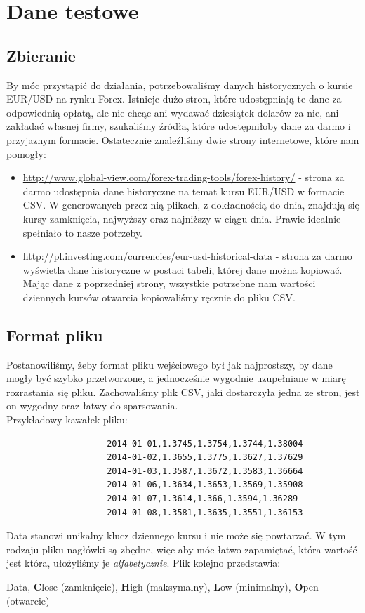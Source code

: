 \documentclass[a4paper]{article}
\begin{document}
		\section{Dane testowe}
			\subsection{Zbieranie}
				By móc przystąpić do działania, potrzebowaliśmy danych historycznych o kursie EUR/USD na rynku Forex. Istnieje dużo stron, które udostępniają te dane za odpowiednią opłatą, ale nie chcąc ani wydawać dziesiątek dolarów za nie, ani zakładać własnej firmy, szukaliśmy źródła, które udostępniłoby dane za darmo i przyjaznym formacie. Ostatecznie znaleźliśmy dwie strony internetowe, które nam pomogły:
				\begin{itemize}
					\item \url{http://www.global-view.com/forex-trading-tools/forex-history/} - strona za darmo udostępnia dane historyczne na temat kursu EUR/USD w formacie CSV. W generowanych przez nią plikach, z dokładnością do dnia, znajdują się kursy zamknięcia, najwyższy oraz najniższy w ciągu dnia. Prawie idealnie spełniało to nasze potrzeby.
					\item \url{http://pl.investing.com/currencies/eur-usd-historical-data} - strona za darmo wyświetla dane historyczne w postaci tabeli, której dane można kopiować. Mając dane z poprzedniej strony, wszystkie potrzebne nam wartości dziennych kursów otwarcia kopiowaliśmy ręcznie do pliku CSV.
				\end{itemize}
			\subsection{Format pliku}\label{subsec:format}
				Postanowiliśmy, żeby format pliku wejściowego był jak najprostszy, by dane mogły być szybko przetworzone, a jednocześnie wygodnie uzupełniane w miarę rozrastania się pliku. Zachowaliśmy plik CSV, jaki dostarczyła jedna ze stron, jest on wygodny oraz łatwy do sparsowania.\\
				Przykładowy kawałek pliku:
				\begin{lstlisting}
					2014-01-01,1.3745,1.3754,1.3744,1.38004
					2014-01-02,1.3655,1.3775,1.3627,1.37629
					2014-01-03,1.3587,1.3672,1.3583,1.36664
					2014-01-06,1.3634,1.3653,1.3569,1.35908
					2014-01-07,1.3614,1.366,1.3594,1.36289
					2014-01-08,1.3581,1.3635,1.3551,1.36153
				\end{lstlisting}
				Data stanowi unikalny klucz dziennego kursu i nie może się powtarzać. W tym rodzaju pliku nagłówki są zbędne, więc aby móc łatwo zapamiętać, która wartość jest która, ułożyliśmy je \textit{alfabetycznie}. Plik kolejno przedstawia:
				\begin{center}
					Data, \textbf{C}lose (zamknięcie), \textbf{H}igh (maksymalny), \textbf{L}ow (minimalny), \textbf{O}pen (otwarcie)
				\end{center}
\end{document}
